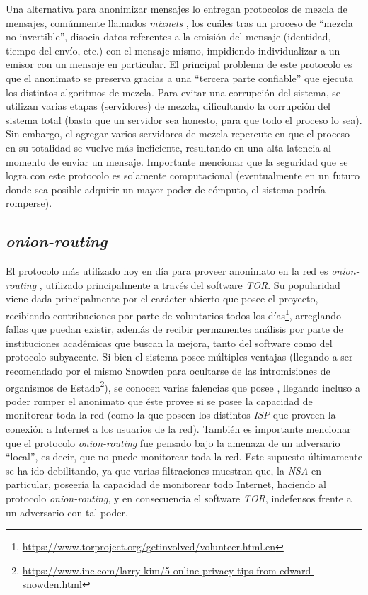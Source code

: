 Una alternativa para anonimizar mensajes lo entregan protocolos de mezcla de mensajes, comúnmente llamados \emph{mixnets} 
\cite{chaum1981untraceable}, los cuáles tras un proceso de ``mezcla no invertible'', disocia datos referentes a la emisión del 
mensaje (identidad, tiempo del envío, etc.) con el mensaje mismo, impidiendo individualizar a un emisor con un mensaje en particular. 
El principal problema de este protocolo es que el anonimato se preserva gracias a una ``tercera parte confiable'' que ejecuta los 
distintos algoritmos de mezcla. Para evitar una corrupción del sistema, se utilizan varias etapas (servidores) de mezcla, dificultando 
la corrupción del sistema total (basta que un servidor sea honesto, para que todo el proceso lo sea). Sin embargo, el agregar varios servidores de 
mezcla repercute en que el proceso en su totalidad se vuelve más ineficiente, resultando en una alta latencia al momento de enviar 
un mensaje. Importante mencionar que la seguridad que se logra con este protocolo es solamente computacional (eventualmente en un futuro 
donde sea posible adquirir un mayor poder de cómputo, el sistema podría romperse).

\subsection{\emph{onion-routing}}

El protocolo más utilizado hoy en día para proveer anonimato en la red es \emph{onion-routing} 
\cite{reed1998anonymous}, utilizado principalmente a través del software \emph{TOR}. Su popularidad viene dada principalmente por 
el carácter abierto que posee el proyecto, recibiendo contribuciones por parte de voluntarios todos los 
días\footnote{\url{https://www.torproject.org/getinvolved/volunteer.html.en}}, arreglando fallas que puedan existir, además de recibir 
permanentes análisis por parte de instituciones académicas que buscan la mejora, tanto del software como del protocolo subyacente. 
Si bien el sistema posee múltiples ventajas (llegando a ser recomendado por el mismo Snowden para ocultarse de las intromisiones de 
organismos de Estado\footnote{\url{https://www.inc.com/larry-kim/5-online-privacy-tips-from-edward-snowden.html}}), 
se conocen varias falencias que posee \cite{syverson2001towards}, llegando incluso a poder romper el anonimato 
que éste provee si se posee la capacidad de monitorear toda la red (como la que poseen los distintos \emph{ISP} que proveen la conexión a 
Internet a los usuarios de la red). También es importante mencionar que el protocolo \emph{onion-routing} fue pensado bajo la amenaza 
de un adversario ``local'', es decir, que no puede monitorear toda la red. Este supuesto últimamente se ha ido debilitando, ya que 
varias filtraciones muestran que, la \emph{NSA} en particular, poseería la capacidad de monitorear todo Internet, haciendo al protocolo 
\emph{onion-routing}, y en consecuencia el software \emph{TOR}, indefensos frente a un adversario con tal poder.

